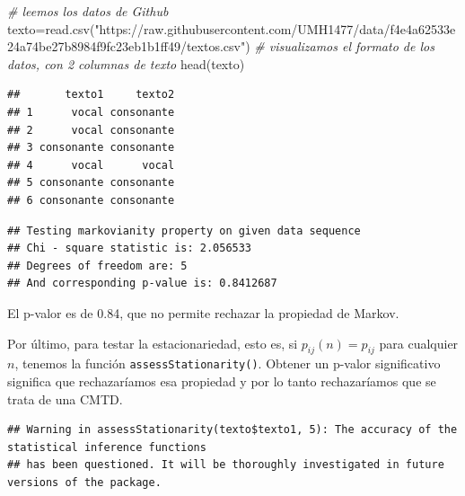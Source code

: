\documentclass[
]{book}
\newenvironment{Shaded}{\begin{snugshade}}{\end{snugshade}}
\newcommand{\CommentTok}[1]{\textcolor[rgb]{0.56,0.35,0.01}{\textit{#1}}}
\newcommand{\DecValTok}[1]{\textcolor[rgb]{0.00,0.00,0.81}{#1}}
\newcommand{\FunctionTok}[1]{\textcolor[rgb]{0.00,0.00,0.00}{#1}}
\newcommand{\NormalTok}[1]{#1}
\newcommand{\OtherTok}[1]{\textcolor[rgb]{0.56,0.35,0.01}{#1}}
\newcommand{\SpecialCharTok}[1]{\textcolor[rgb]{0.00,0.00,0.00}{#1}}
\newcommand{\StringTok}[1]{\textcolor[rgb]{0.31,0.60,0.02}{#1}}
\theoremstyle{definition}
\theoremstyle{definition}
\theoremstyle{definition}
\theoremstyle{definition}
\theoremstyle{remark}
\begin{document}
\begin{Shaded}
\begin{Highlighting}[]
\CommentTok{\# leemos los datos de Github}
\NormalTok{texto}\OtherTok{=}\FunctionTok{read.csv}\NormalTok{(}\StringTok{"https://raw.githubusercontent.com/UMH1477/data/f4e4a62533e24a74be27b8984f9fc23eb1b1ff49/textos.csv"}\NormalTok{)}
\CommentTok{\# visualizamos el formato de los datos, con 2 columnas de texto}
\FunctionTok{head}\NormalTok{(texto)}
\end{Highlighting}
\end{Shaded}

\begin{verbatim}
##       texto1     texto2
## 1      vocal consonante
## 2      vocal consonante
## 3 consonante consonante
## 4      vocal      vocal
## 5 consonante consonante
## 6 consonante consonante
\end{verbatim}

\begin{Shaded}
\end{Shaded}

\begin{verbatim}
## Testing markovianity property on given data sequence
## Chi - square statistic is: 2.056533 
## Degrees of freedom are: 5 
## And corresponding p-value is: 0.8412687
\end{verbatim}

El p-valor es de 0.84, que no permite rechazar la propiedad de Markov.

Por último, para testar la estacionariedad, esto es, si \(p_{ij}(n)=p_{ij}\) para cualquier \(n\), tenemos la función \texttt{assessStationarity()}. Obtener un p-valor significativo significa que rechazaríamos esa propiedad y por lo tanto rechazaríamos que se trata de una CMTD.

\begin{Shaded}
\end{Shaded}

\begin{verbatim}
## Warning in assessStationarity(texto$texto1, 5): The accuracy of the statistical inference functions
## has been questioned. It will be thoroughly investigated in future versions of the package.
\end{verbatim}
\end{document}

